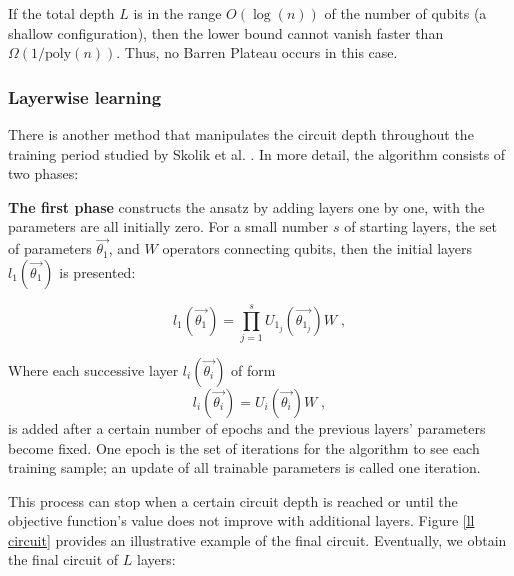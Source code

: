 If the total depth $L$ is in the range $O(\log(n))$ of the number of qubits (a shallow configuration), then the lower bound cannot vanish faster than $\Omega(1/\mathrm{poly}(n))$. 
Thus, no Barren Plateau occurs in this case.



\subsubsection{Layerwise learning}

There is another method that manipulates the circuit depth throughout the training period studied by Skolik et al. \cite{skolikLayerwiseLearningQuantum2021}. 
In more detail, the algorithm consists of two phases:

\textbf{The first phase} constructs the ansatz by adding layers one by one, with the parameters are all initially zero. For a small number $s$ of starting layers, the set of parameters $\vec{\theta_1}$, and $W$ operators connecting qubits, then the initial layers $l_1(\vec{\theta_1})$ is presented:

\begin{equation}
    l_1(\vec{\theta_1})
    = \prod_{j=1}^s U_{1_j}(\vec{\theta_{1_j}}) W \;,
\end{equation}

Where each successive layer $l_i(\vec{\theta_i})$ of form
\begin{equation}
    l_i(\vec{\theta_i})
    =U_i(\vec{\theta_i}) W \;,
\end{equation}
is added after a certain number of epochs and the previous layers' parameters become fixed. 
One epoch is the set of iterations for the algorithm to see each training sample; an update of all trainable parameters is called one iteration.

This process can stop when a certain circuit depth is reached or until the objective function's value does not improve with additional layers.
Figure \ref{ll circuit} provides an illustrative example of the final circuit.
Eventually, we obtain the final circuit of $L$ layers:

